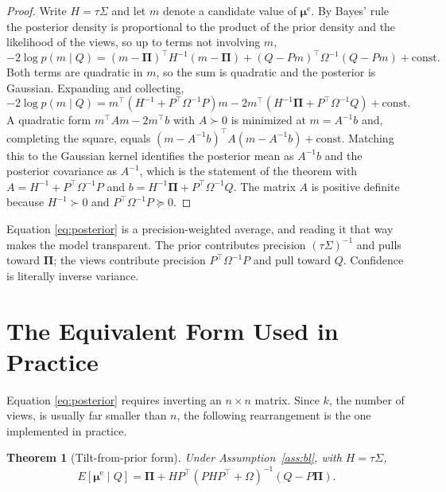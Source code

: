\documentclass[11pt]{article}
\newtheorem{theorem}{Theorem}
\theoremstyle{remark}
\theoremstyle{definition}
\begin{document}
\begin{proof}
Write $H = \tau\Sigma$ and let $m$ denote a candidate value of $\boldsymbol\mu^{\mathrm{e}}$. By Bayes' rule the posterior density is proportional to the product of the prior density and the likelihood of the views, so up to terms not involving $m$,
\begin{equation*}
-2\log p(m \mid Q) = (m-\boldsymbol\Pi)^\top H^{-1}(m-\boldsymbol\Pi) + (Q-Pm)^\top\Omega^{-1}(Q-Pm) + \text{const}.
\end{equation*}
Both terms are quadratic in $m$, so the sum is quadratic and the posterior is Gaussian. Expanding and collecting,
\begin{equation*}
-2\log p(m\mid Q) = m^\top\!\left(H^{-1} + P^\top\Omega^{-1}P\right)\! m - 2m^\top\!\left(H^{-1}\boldsymbol\Pi + P^\top\Omega^{-1}Q\right) + \text{const}.
\end{equation*}
A quadratic form $m^\top A m - 2m^\top b$ with $A \succ 0$ is minimized at $m = A^{-1}b$ and, completing the square, equals $(m - A^{-1}b)^\top A (m - A^{-1}b) + \text{const}$. Matching this to the Gaussian kernel identifies the posterior mean as $A^{-1}b$ and the posterior covariance as $A^{-1}$, which is the statement of the theorem with $A = H^{-1} + P^\top\Omega^{-1}P$ and $b = H^{-1}\boldsymbol\Pi + P^\top\Omega^{-1}Q$. The matrix $A$ is positive definite because $H^{-1} \succ 0$ and $P^\top\Omega^{-1}P \succeq 0$.
\end{proof}

Equation \eqref{eq:posterior} is a precision-weighted average, and reading it that way makes the model transparent. The prior contributes precision $(\tau\Sigma)^{-1}$ and pulls toward $\boldsymbol\Pi$; the views contribute precision $P^\top\Omega^{-1}P$ and pull toward $Q$. Confidence is literally inverse variance.

\section{The Equivalent Form Used in Practice}
\label{sec:woodbury}

Equation \eqref{eq:posterior} requires inverting an $n\times n$ matrix. Since $k$, the number of views, is usually far smaller than $n$, the following rearrangement is the one implemented in practice.

\begin{theorem}[Tilt-from-prior form]
\label{thm:woodbury}
Under Assumption~\ref{ass:bl}, with $H = \tau\Sigma$,
\begin{equation}
\label{eq:woodbury}
E[\boldsymbol\mu^{\mathrm{e}} \mid Q] = \boldsymbol\Pi + H P^\top\left(P H P^\top + \Omega\right)^{-1}\left(Q - P\boldsymbol\Pi\right).
\end{equation}
\end{theorem}
\end{document}
